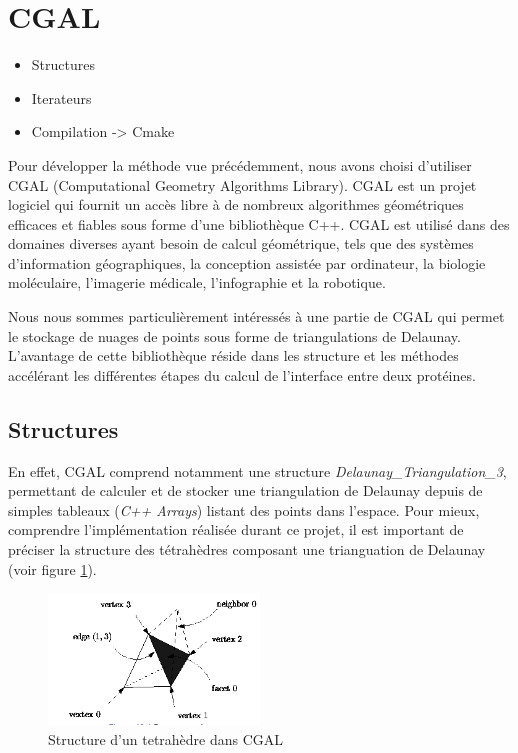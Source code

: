 \section{CGAL}
\begin{itemize}
  \item Structures
  \item Iterateurs
  \item Compilation -> Cmake
\end{itemize}

Pour développer la méthode vue précédemment, nous avons choisi d'utiliser CGAL
(Computational Geometry Algorithms Library).
CGAL est un projet logiciel qui fournit un accès libre à de nombreux algorithmes géométriques
efficaces et fiables sous forme d'une bibliothèque C++. CGAL est utilisé dans des
domaines diverses ayant besoin de calcul géométrique, tels que des systèmes
d'information géographiques, la conception assistée par ordinateur, la biologie
moléculaire, l'imagerie médicale, l'infographie et la robotique.

Nous nous sommes particulièrement intéressés à une partie de CGAL qui permet le
stockage de nuages de points sous forme de triangulations de Delaunay. L'avantage
de cette bibliothèque réside dans les structure et les méthodes accélérant les différentes
étapes du calcul de l'interface entre deux protéines.

\subsection*{Structures}


En effet, CGAL comprend notamment une structure \textit{Delaunay\_Triangulation\_3},
permettant de calculer et de stocker une triangulation de Delaunay depuis de simples
tableaux (\textit{C++ Arrays}) listant des points dans l'espace. Pour mieux, comprendre
l'implémentation réalisée durant ce projet, il est important de préciser la structure des tétrahèdres
composant une trianguation de Delaunay (voir figure \ref{fig::tetrahedron_cgal}).

\begin{figure}[ht]
\centering
  \includegraphics[width=0.5\textwidth]{figures/tetrahedron_cgal.png}
  \caption{Structure d'un tetrahèdre dans CGAL}
  \label{fig::tetrahedron_cgal}
\end{figure}


